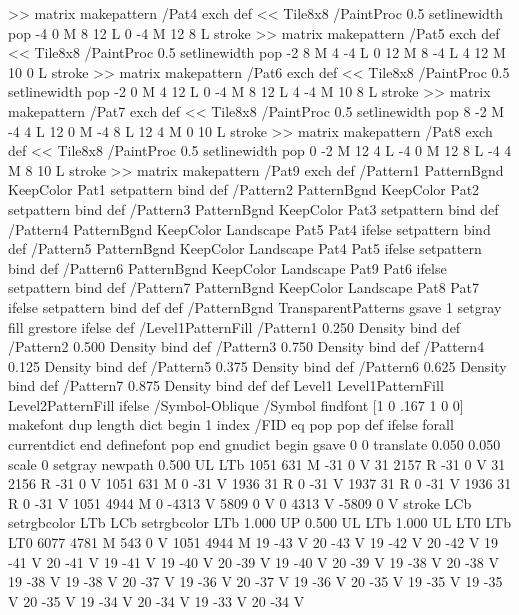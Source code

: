 {{{>> matrix makepattern
/Pat4 exch def
<< Tile8x8
 /PaintProc {0.5 setlinewidth pop -4 0 M 8 12 L
	0 -4 M 12 8 L stroke}
>> matrix makepattern
/Pat5 exch def
<< Tile8x8
 /PaintProc {0.5 setlinewidth pop -2 8 M 4 -4 L
	0 12 M 8 -4 L 4 12 M 10 0 L stroke}
>> matrix makepattern
/Pat6 exch def
<< Tile8x8
 /PaintProc {0.5 setlinewidth pop -2 0 M 4 12 L
	0 -4 M 8 12 L 4 -4 M 10 8 L stroke}
>> matrix makepattern
/Pat7 exch def
<< Tile8x8
 /PaintProc {0.5 setlinewidth pop 8 -2 M -4 4 L
	12 0 M -4 8 L 12 4 M 0 10 L stroke}
>> matrix makepattern
/Pat8 exch def
<< Tile8x8
 /PaintProc {0.5 setlinewidth pop 0 -2 M 12 4 L
	-4 0 M 12 8 L -4 4 M 8 10 L stroke}
>> matrix makepattern
/Pat9 exch def
/Pattern1 {PatternBgnd KeepColor Pat1 setpattern} bind def
/Pattern2 {PatternBgnd KeepColor Pat2 setpattern} bind def
/Pattern3 {PatternBgnd KeepColor Pat3 setpattern} bind def
/Pattern4 {PatternBgnd KeepColor Landscape {Pat5} {Pat4} ifelse setpattern} bind def
/Pattern5 {PatternBgnd KeepColor Landscape {Pat4} {Pat5} ifelse setpattern} bind def
/Pattern6 {PatternBgnd KeepColor Landscape {Pat9} {Pat6} ifelse setpattern} bind def
/Pattern7 {PatternBgnd KeepColor Landscape {Pat8} {Pat7} ifelse setpattern} bind def
} def
%
%
%
/PatternBgnd {
  TransparentPatterns {} {gsave 1 setgray fill grestore} ifelse
} def
%
%
/Level1PatternFill {
/Pattern1 {0.250 Density} bind def
/Pattern2 {0.500 Density} bind def
/Pattern3 {0.750 Density} bind def
/Pattern4 {0.125 Density} bind def
/Pattern5 {0.375 Density} bind def
/Pattern6 {0.625 Density} bind def
/Pattern7 {0.875 Density} bind def
} def
%
%
Level1 {Level1PatternFill} {Level2PatternFill} ifelse
%
/Symbol-Oblique /Symbol findfont [1 0 .167 1 0 0] makefont
dup length dict begin {1 index /FID eq {pop pop} {def} ifelse} forall
currentdict end definefont pop
end
gnudict begin
gsave
0 0 translate
0.050 0.050 scale
0 setgray
newpath
0.500 UL
LTb
1051 631 M
-31 0 V
31 2157 R
-31 0 V
31 2156 R
-31 0 V
1051 631 M
0 -31 V
1936 31 R
0 -31 V
1937 31 R
0 -31 V
1936 31 R
0 -31 V
1051 4944 M
0 -4313 V
5809 0 V
0 4313 V
-5809 0 V
stroke
LCb setrgbcolor
LTb
LCb setrgbcolor
LTb
1.000 UP
0.500 UL
LTb
1.000 UL
LT0
LTb
LT0
6077 4781 M
543 0 V
1051 4944 M
19 -43 V
20 -43 V
19 -42 V
20 -42 V
19 -41 V
20 -41 V
19 -41 V
19 -40 V
20 -39 V
19 -40 V
20 -39 V
19 -38 V
20 -38 V
19 -38 V
19 -38 V
20 -37 V
19 -36 V
20 -37 V
19 -36 V
20 -35 V
19 -35 V
19 -35 V
20 -35 V
19 -34 V
20 -34 V
19 -33 V
20 -34 V
}}
